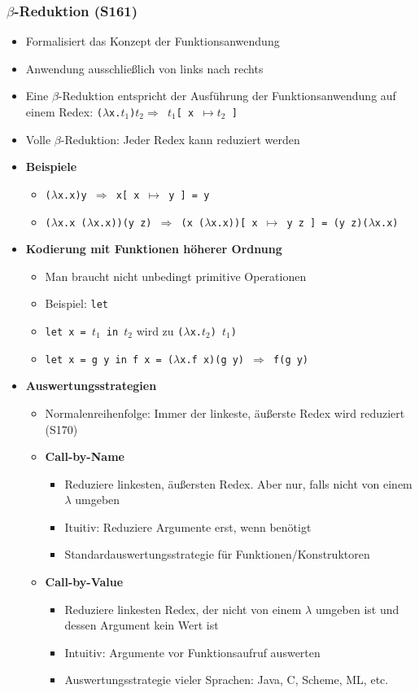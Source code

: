 \subsubsection{$\beta$-Reduktion (S161)}
\begin{itemize}
	\item Formalisiert das Konzept der Funktionsanwendung
	\item Anwendung ausschließlich von links nach rechts
	\item Eine \(\beta\)-Reduktion entspricht der Ausführung der Funktionsanwendung auf einem Redex: \texttt{(\(\lambda\)x.\(t_1\))\(t_2 \Rightarrow\) \(t_1\){[} x \(\mapsto t_2\) {]}}
	\item Volle \(\beta\)-Reduktion: Jeder Redex kann reduziert werden
	\item \textbf{Beispiele}
	\begin{itemize}
		\item \texttt{(\(\lambda\)x.x)y \(\Rightarrow\) x{[} x \(\mapsto\) y {]} = y}
		\item \texttt{(\(\lambda\)x.x (\(\lambda\)x.x))(y z) \(\Rightarrow\) (x (\(\lambda\)x.x)){[} x \(\mapsto\) y z {]} = (y z)(\(\lambda\)x.x)}
	\end{itemize}
	\item \textbf{Kodierung mit Funktionen höherer Ordnung}
	\begin{itemize}
		\item Man braucht nicht unbedingt primitive Operationen
		\item Beispiel: \texttt{let}
		\item \texttt{let x = \(t_1\) in \(t_2\)} wird zu \texttt{(\(\lambda\)x.\(t_2\)) \(t_1\))}
		\item \texttt{let x = g y in f x = (\(\lambda\)x.f x)(g y) \(\Rightarrow\) f(g y)}
	\end{itemize}
	\item \textbf{Auswertungsstrategien}
	\begin{itemize}
		\item Normalenreihenfolge: Immer der linkeste, äußerste Redex wird reduziert (S170)
		\item \textbf{Call-by-Name}
		\begin{itemize}
			\item Reduziere linkesten, äußersten Redex. Aber nur, falls nicht von einem \(\lambda\) umgeben
			\item Ituitiv: Reduziere Argumente erst, wenn benötigt
			\item Standardauswertungsstrategie für Funktionen/Konstruktoren
		\end{itemize}
		\item \textbf{Call-by-Value}
		\begin{itemize}
			\item Reduziere linkesten Redex, der nicht von einem \(\lambda\) umgeben ist und dessen Argument kein Wert ist
			\item Intuitiv: Argumente vor Funktionsaufruf auswerten
			\item Auswertungsstrategie vieler Sprachen: Java, C, Scheme, ML, etc.
		\end{itemize}
	\end{itemize}
\end{itemize}


